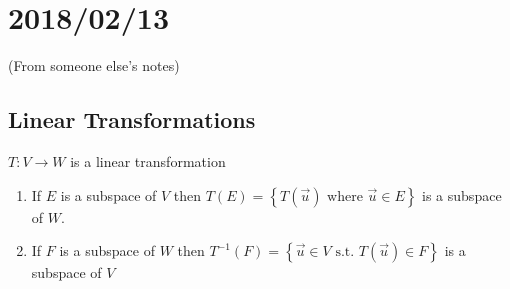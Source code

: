 \documentclass[12pt]{article}
\renewcommand{\v}[1]{\overrightarrow{#1}}
\newenvironment{proof}{\block[Proof]}{\endblock}
\newenvironment{proposition}{\block[Proposition]}{\endblock}
\newcommand{\st}[0]{\text{ s.t. }}
\newcommand{\bb}[1]{\left\{#1\right\}}
\begin{document}
\begin{proposition}
\begin{enumerate}
\begin{proof}
\begin{enumerate}
				\end{enumerate}
				
			\end{proof}
		\end{enumerate}
	\end{proposition}
	
	\section{2018/02/13}
	
	(From someone else's notes)
	
	\subsection{Linear Transformations}
	
	\begin{proposition}
		$T: V \rightarrow W$ is a linear transformation
		\begin{enumerate}
			\item If $E$ is a subspace of $V$ then $T(E) = \bb{T(\v{u}) \text{ where } \v{u} \in E}$ is a subspace of $W$.
			\item If $F$ is a subspace of $W$ then $T^{-1}(F) = \bb{\v{u} \in V \st T(\v{u}) \in F}$ is a subspace of $V$
		\end{enumerate}
	\end{proposition}
	
\end{document}

